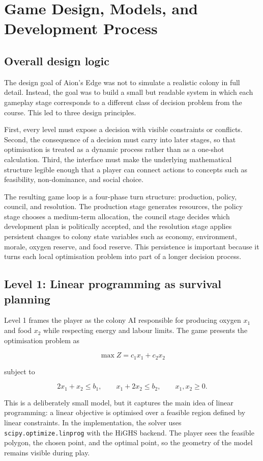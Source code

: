 \section{Game Design, Models, and Development Process}

\subsection{Overall design logic}

The design goal of Aion's Edge was not to simulate a realistic colony in
full detail. Instead, the goal was to build a small but readable system
in which each gameplay stage corresponds to a different class of
decision problem from the course. This led to three design principles.

First, every level must expose a decision with visible constraints or
conflicts. Second, the consequence of a decision must carry into later
stages, so that optimisation is treated as a dynamic process rather than
as a one-shot calculation. Third, the interface must make the underlying
mathematical structure legible enough that a player can connect actions
to concepts such as feasibility, non-dominance, and social choice.

The resulting game loop is a four-phase turn structure: production,
policy, council, and resolution. The production stage generates
resources, the policy stage chooses a medium-term allocation, the council
stage decides which development plan is politically accepted, and the
resolution stage applies persistent changes to colony state variables
such as economy, environment, morale, oxygen reserve, and food reserve.
This persistence is important because it turns each local optimisation
problem into part of a longer decision process.

\subsection{Level 1: Linear programming as survival planning}

Level 1 frames the player as the colony AI responsible for producing
oxygen $x_1$ and food $x_2$ while respecting energy and labour limits.
The game presents the optimisation problem as

\[
\max Z = c_1 x_1 + c_2 x_2
\]

subject to

\[
2x_1 + x_2 \leq b_1, \qquad x_1 + 2x_2 \leq b_2, \qquad x_1, x_2 \geq 0.
\]

This is a deliberately small model, but it captures the main idea of
linear programming: a linear objective is optimised over a feasible
region defined by linear constraints. In the
implementation, the solver uses \texttt{scipy.optimize.linprog} with
the HiGHS backend. The player sees the feasible polygon, the chosen
point, and the optimal point, so the geometry of the model remains
visible during play.

